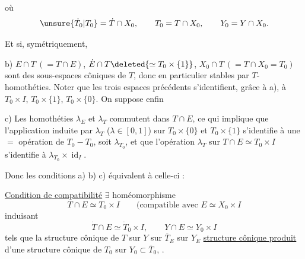 où
\[
\unsure{\dot T_0|T_0}=\dot T\cap X_0,\qquad
T_0=T\cap X_0,\qquad
Y_0=Y\cap X_0.
\]

Et si, symétriquement,

b) $E\cap T\ (=T\cap E)$, $\dot E\cap T\deleted{\simeq T_0\times\{1\}}$,
$X_0\cap T\ (=T\cap X_0=T_0)$ sont des
sous-espaces côniques de $T$, donc en particulier
stables par $T$-homothéties.  Noter que
les trois espaces précédents s'identifient, grâce à a),
à $T_0\times I$, $T_0\times\{1\}$, $T_0\times\{0\}$. On suppose enfin

c) Les homothéties  $\lambda_E$ et $\lambda_T$ commutent
dans $T\cap E$, ce qui implique que l'application
\deleted{$\unsure{\lambda}$} induite par $\lambda_T$ ($\lambda\in[0,1]$) sur
$T_0\times\{0\}$ et $T_0\times\{1\}$
s'identifie à une $=$  opération de
$T_0-T_0$,  soit $\lambda_{T_0}$, et que l'opération
$\lambda_T$ sur $T\cap E\simeq T_0\times I$ s'identifie à
 $\lambda_{T_0}\times\operatorname{id}_I$.

Donc les conditions a) b) c) équivalent à celle-ci :

\uline{Condition de compatibilité} $\exists$ homéomorphisme
\[
T\cap E\simeq T_0\times I
\qquad\text{(compatible avec }E\simeq X_0\times I
\]
induisant
\[
\dot T\cap E\simeq\dot T_0\times I,\qquad Y\cap E\simeq Y_0\times I
\]
tels que la structure cônique de $T$ sur $Y$
 sur $\overline T_E$ sur $Y_E$
 
\uline{structure cônique produit} 
d'une structure cônique de
$T_0$ sur $Y_0\subset\overline T_0$, .
